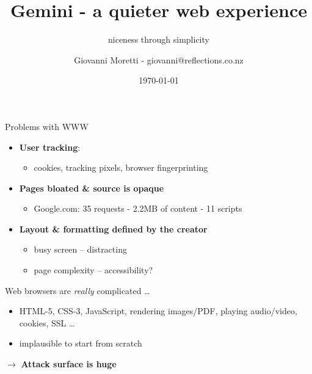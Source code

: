 \documentclass[presentation, 11pt,  aspectratio=169]{beamer}
\author{Giovanni Moretti - giovanni@reflections.co.nz}
\date{\today}
\title{Gemini - a quieter web experience}
\subtitle{niceness through simplicity}
\renewcommand{\alert}[1]{\textbf{\textcolor{mydarkred}{#1}}}
\begin{document}
\maketitle

\begin{frame}[label={sec:org5e40bdd}]{Problems with WWW}
\begin{itemize}
\item \alert{User tracking}:\\
\begin{itemize}
\item cookies, tracking pixels, browser fingerprinting\\
\end{itemize}

\item \alert{Pages bloated \& source is opaque}\\
\begin{itemize}
\item Google.com: 35 requests - 2.2MB of content - 11 scripts\\
\end{itemize}

\item \alert{Layout \& formatting defined by the creator}\\
\begin{itemize}
\item busy screen -- distracting\\
\item page complexity -- accessibility?\\
\end{itemize}
\pause
\end{itemize}
\vspace{1.5em}
\begin{block}{Web browsers are \emph{really} complicated \ldots{}}
\begin{itemize}
\item HTML-5, CSS-3, JavaScript, rendering images/PDF, playing audio/video, cookies, SSL \ldots{}\\
\item implausible to start from scratch\\
\end{itemize}
\(\rightarrow\) \alert{Attack surface is huge}\\
\end{block}
\end{frame}
\end{document}
